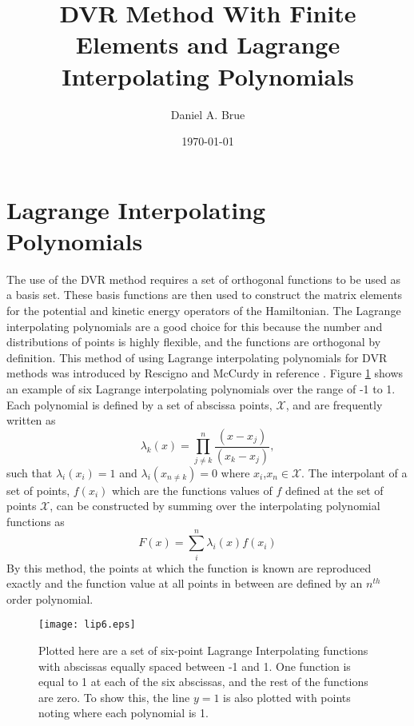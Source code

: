 \documentclass[preprint]{revtex4}
\begin{document}
\title{DVR Method With Finite Elements and Lagrange Interpolating Polynomials}
\author{Daniel A. Brue}
\date{\today}
\maketitle

\section{Lagrange Interpolating Polynomials}
The use of the DVR \cite{DVR1986} method requires a set of orthogonal functions to 
be used as a basis set. These basis functions are then used to construct the 
matrix elements for the potential and kinetic energy operators of the Hamiltonian. 
The Lagrange interpolating polynomials are a good choice for this because the 
number and distributions of points is highly flexible, and the functions are
orthogonal by definition. This method of using Lagrange interpolating polynomials for
DVR methods was introduced by Rescigno and McCurdy in reference \cite{FEMDVR2000}. 
Figure \ref{lip6} shows an example of six Lagrange interpolating
polynomials over the range of -1 to 1. Each polynomial is defined by a set of 
abscissa points, $\mathcal X$, and are frequently written as 
\begin{equation}
\label{lipdef}
\lambda_k(x)=\prod_{j \ne k}^n\frac{(x-x_j)}{(x_k-x_j)},
\end{equation}
such that $\lambda_i(x_i)=1$ and $\lambda_i(x_{n\ne k})=0$ where $x_i$,$x_n\in \mathcal X$. 
The interpolant of a set of points, $f(x_i)$ which are the functions values of $f$ defined
at the set of points $\mathcal X$, can be constructed by summing over the interpolating
polynomial functions as
\begin{equation}
\label{interpdef}
F(x)=\sum_i^n \lambda_i(x)f(x_i)
\end{equation}
By this method, the points at which the function is known are reproduced exactly 
and the function value at all points in between are defined by an $n^{th}$ order
polynomial. 

\begin{figure}[b]
\texttt{[image: lip6.eps]}
\caption {Plotted here are a set of six-point Lagrange Interpolating functions with
abscissas equally spaced between -1 and 1. One function is equal to 1 at each of the
six abscissas, and the rest of the functions are zero. To show this, the line $y=1$ is
also plotted with points noting where each polynomial is 1. }
\label{lip6}
\end{figure}
\end{document}
